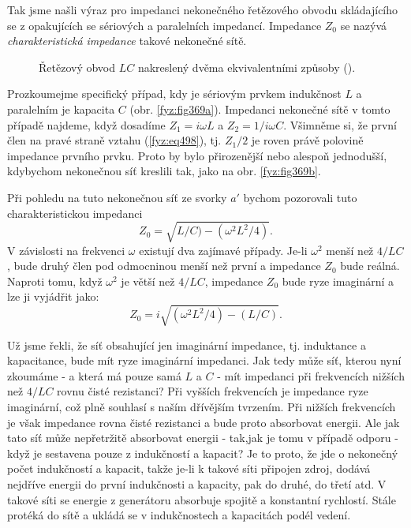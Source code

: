   Tak jsme našli výraz pro impedanci nekonečného řetězového obvodu skládajícího se z opakujících se 
  sériových a paralelních impedancí. Impedance \(Z_0\) se nazývá \emph{charakteristická impedance} 
  takové nekonečné sítě. 
  
  \begin{figure}[ht!] %
    \centering
      \newline
    \caption{Řetězový obvod \(LC\) nakreslený dvěma ekvivalentními způsoby
             (\cite[s.~409]{Feynman02}).}
    \label{fyz:fig369}
  \end{figure}
  Prozkoumejme specifický případ, kdy je sériovým prvkem indukčnost \(L\) a paralelním je kapacita 
  \(C\) (obr. \ref{fyz:fig369a}). Impedanci nekonečné sítě v tomto případě najdeme, když dosadíme 
  \(Z_1 =i\omega L\) a \(Z_2 = 1/i\omega C\). Všimněme si, že první člen na pravé straně vztahu 
  (\ref{fyz:eq498}), tj. \(Z_1/2\) je roven právě polovině impedance prvního prvku. Proto by bylo 
  přirozenější nebo alespoň jednodušší, kdybychom nekonečnou síť kreslili tak, jako na obr. 
  \ref{fyz:fig369b}.
  
  Při pohledu na tuto nekonečnou síť ze svorky \(a'\) bychom pozorovali tuto charakteristickou 
  impedanci
  \begin{equation}\label{fyz:eq499}
    Z_0 = \sqrt{L/C) - (\omega^2L^2/4)}.
  \end{equation}
  V závislosti na frekvenci \(\omega\) existují dva zajímavé případy. Je-li \(\omega^2\) menší než 
  \(4/LC\), bude druhý člen pod odmocninou menší než první a impedance \(Z_0\) bude reálná. Naproti 
  tomu, když \(\omega^2\) je větší než \(4/LC\), impedance \(Z_0\) bude ryze imaginární a lze ji 
  vyjádřit jako:
  \begin{equation*}
    Z_0 = i\sqrt{(\omega^2L^2/4) - (L/C)}.
  \end{equation*}
  
  Už jsme řekli, že síť obsahující jen imaginární impedance, tj. induktance a kapacitance, bude mít 
  ryze imaginární impedanci. Jak tedy může síť, kterou nyní zkoumáme - a která má pouze samá \(L\) 
  a \(C\) - mít impedanci při frekvencích nižších než \(4/LC\) rovnu čisté rezistanci? Při vyšších 
  frekvencích je impedance ryze imaginární, což plně souhlasí s naším dřívějším tvrzením. Při 
  nižších frekvencích je však impedance rovna čisté rezistanci a bude proto absorbovat energii. Ale 
  jak tato síť může nepřetržitě absorbovat energii - tak,jak je tomu v případě odporu - když je 
  sestavena pouze z indukčností a kapacit? Je to proto, že jde o nekonečný počet indukčností a 
  kapacit, takže je-li k takové síti připojen zdroj, dodává nejdříve energii do první indukčnosti a 
  kapacity, pak do druhé, do třetí atd. V takové síti se energie z generátoru absorbuje spojitě a 
  konstantní rychlostí. Stále protéká do sítě a ukládá se v indukčnostech a kapacitách podél vedení.
  
